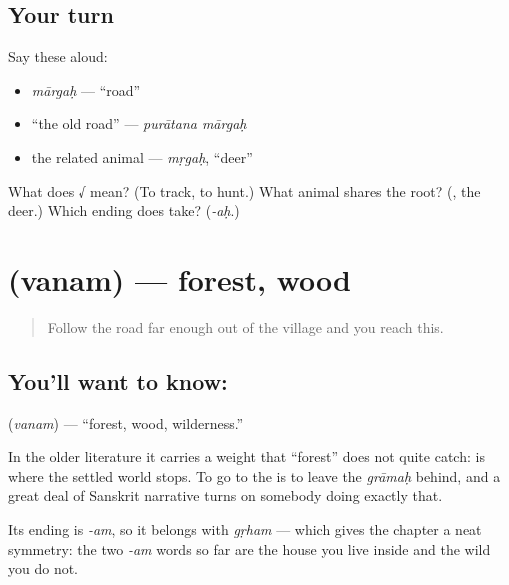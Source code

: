 \subsection*{Your turn}
Say these aloud:

\begin{itemize}
\raggedright
  \item \emph{mārgaḥ} — \textquotedblleft{}road\textquotedblright{}
  \item \textquotedblleft{}the old road\textquotedblright{} — \emph{purātana mārgaḥ}
  \item the related animal — \emph{mṛgaḥ}, \textquotedblleft{}deer\textquotedblright{}
\end{itemize}

\begin{tcolorbox}[breakable,colback=teal!4,colframe=teal!35!black,title={Before you move on}]
What does √ mean? (To track, to hunt.) What animal shares the root? (, the deer.) Which ending does  take? (\emph{-aḥ}.)
\end{tcolorbox}
\section[\texorpdfstring{\sk{वनम्} (vanam)}{वनम् (vanam)}]{ (vanam) — forest, wood}

\label{lesson:SA-C16-forest}



\begin{quote}
Follow the road far enough out of the village and you reach this.
\end{quote}

\subsection*{You'll want to know: }
\textbf{} (\emph{vanam}) — \textquotedblleft{}forest, wood, wilderness.\textquotedblright{}

In the older literature it carries a weight that \textquotedblleft{}forest\textquotedblright{} does not quite catch: \emph{} is where the settled world stops. To go to the \emph{} is to leave the \emph{grāmaḥ} behind, and a great deal of Sanskrit narrative turns on somebody doing exactly that.

Its ending is \emph{-am}, so it belongs with \emph{gṛham} — which gives the chapter a neat symmetry: the two \emph{-am} words so far are the house you live inside and the wild you do not.

